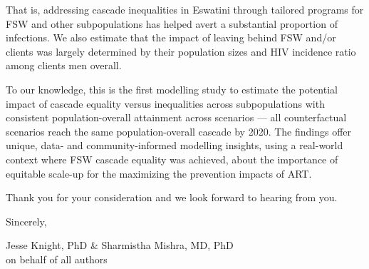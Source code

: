 That is, addressing cascade inequalities in Eswatini
through tailored programs for FSW and other subpopulations
has helped avert a substantial proportion of infections.
We also estimate that the impact of
leaving behind FSW and/or clients was largely determined by
their population sizes and HIV incidence ratio among clients \vs men overall.
\par
To our knowledge, this is the first modelling study to estimate
the potential impact of cascade equality versus inequalities across subpopulations
with consistent population-overall attainment across scenarios ---
\ie all counterfactual scenarios reach the same population-overall cascade by 2020.
The findings offer unique, data- and community-informed modelling insights,
using a real-world context where FSW cascade equality was achieved,
about the importance of equitable scale-up
for the maximizing the prevention impacts of ART.
\par
Thank you for your consideration and we look forward to hearing from you.
\medskip\par
Sincerely,
\par
Jesse Knight, PhD \& Sharmistha Mishra, MD, PhD\\
on behalf of all authors
\restoregeometry%
